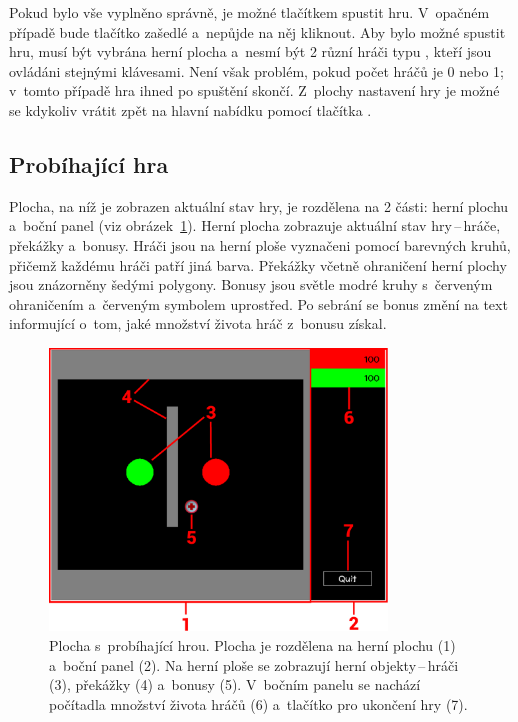 Pokud bylo vše vyplněno správně, je možné tlačítkem  spustit hru. V~opačném případě bude tlačítko zašedlé a~nepůjde na něj kliknout. Aby bylo možné spustit hru, musí být vybrána herní plocha a~nesmí být 2 různí hráči typu , kteří jsou ovládáni stejnými klávesami. Není však problém, pokud počet hráčů je 0 nebo 1; v~tomto případě hra ihned po spuštění skončí. Z~plochy nastavení hry je možné se kdykoliv vrátit zpět na hlavní nabídku pomocí tlačítka .

\subsection*{Probíhající hra}

Plocha, na níž je zobrazen aktuální stav hry, je rozdělena na 2 části: herní plochu a~boční panel (viz obrázek~\ref{fig:in-game}). Herní plocha zobrazuje aktuální stav hry\,--\,hráče, překážky a~bonusy. Hráči jsou na herní ploše vyznačeni pomocí barevných kruhů, přičemž každému hráči patří jiná barva. Překážky včetně ohraničení herní plochy jsou znázorněny šedými polygony. Bonusy jsou světle modré kruhy s~červeným ohraničením a~červeným symbolem  uprostřed. Po sebrání se bonus změní na text informující o~tom, jaké množství života hráč z~bonusu získal.

\begin{figure}[ht]
    \centering
    \includegraphics[width=0.8\textwidth]{doc/obrazky-figures/in-game.pdf}
    \caption{Plocha s~probíhající hrou. Plocha je rozdělena na herní plochu (1) a~boční panel (2). Na herní ploše se zobrazují herní objekty\,--\,hráči (3), překážky (4) a~bonusy (5). V~bočním panelu se nachází počítadla množství života hráčů (6) a~tlačítko pro ukončení hry (7).}
    \label{fig:in-game}
\end{figure}


